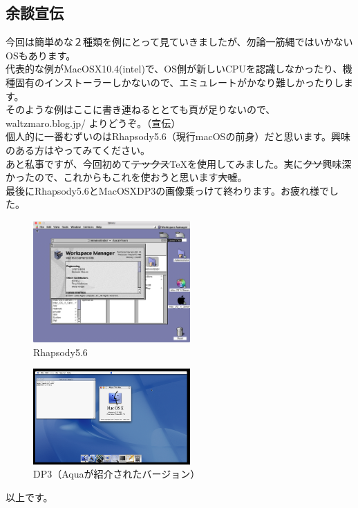 \documentclass[b5paper,9pt,platex,dvipdfmx]{jsarticle}
\begin{document}
\begin{multicols*}{3}
\section{余談宣伝}
今回は簡単めな２種類を例にとって見ていきましたが、勿論一筋縄ではいかないOSもあります。\\
代表的な例がMacOSX10.4(intel)で、OS側が新しいCPUを認識しなかったり、機種固有のインストーラーしかないので、エミュレートがかなり難しかったりします。\\
そのような例はここに書き連ねるととても頁が足りないので、waltzmaro.blog.jp/ よりどうぞ。（宣伝）\\
個人的に一番むずいのはRhapsody5.6（現行macOSの前身）だと思います。興味のある方はやってみてください。\\
あと私事ですが、今回初めて\sout{テックス}\TeX を使用してみました。実に\sout{クソ}興味深かったので、これからもこれを使おうと思います\sout{大嘘}。\\
最後にRhapsody5.6とMacOSXDP3の画像乗っけて終わります。お疲れ様でした。\\
\begin{figure}[H]
  \centering
  \includegraphics[width=6cm]{osx-rhapsody.png}
  \caption{Rhapsody5.6}
\end{figure}
\begin{figure}[H]
  \centering
  \includegraphics[width=6cm]{osx-dp3.png}
  \caption{DP3（Aquaが紹介されたバージョン）}
\end{figure}
以上です。\\




\end{multicols*}
\end{document}
